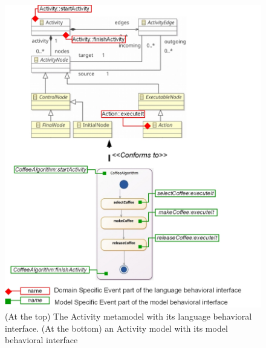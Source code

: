 	\begin{figure}
		\begin{center}
			\includegraphics[width=1\textwidth]{bcool/figs/admm.jpg}
			\caption{(At the top) The Activity metamodel with its language behavioral interface. (At the bottom) an Activity model with its model behavioral interface}
			\label{fig:activitymm}
		\end{center}
	\end{figure}
	
